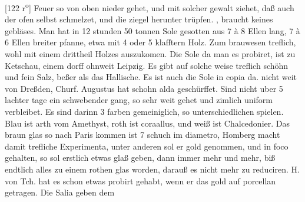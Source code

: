                 \vspace*{8mm}
                \pstart 
                \normalsize
            [122 r\textsuperscript{o}] Feuer\protect{} so von oben nieder gehet, und mit solcher gewalt ziehet, daß auch der ofen\protect{} selbst schmelzet, und die ziegel herunter tr\"{u}pfen. , braucht keines gebl\"{a}ses\protect{}. Man hat in 12 stunden 50 tonnen Sole\protect{} gesotten aus 7 \`{a} 8 Ellen lang, 7 \`{a} 6 Ellen breiter pfanne, etwa mit 4 oder 5 klafftern Holz. Zum brauwesen\protect{} treflich, wohl mit einem drittheil Holzes auszukomen. Die Sole\protect{} da man es probiret, ist zu Ketschau\protect{}, einem dorff ohnweit Leipzig\protect{}. Es gibt auf solche weise treflich sch\"{o}hn und fein Salz\protect{}, beßer als das Hallische. Es ist auch die Sole\protect{} in copia da. \pend \pstart  {} nicht weit von Dreßden\protect{}, Churf. Augustus\protect{} hat schohn alda gesch\"{u}rffet. Sind nicht uber 5 lachter  tage ein schwebender gang, so sehr weit gehet und zimlich uniform verbleibet. Es sind darinn 3 farben gemeiniglich, so unterschiedlichen spielen. Blau ist arth vom Amethyst, roth ist coraallus, und weiß ist Chalcedonier. \pend \pstart  Das braun glas\protect{} so nach Paris\protect{} kommen ist 7 schuch im diametro, Homberg\protect{} macht damit trefliche Experimenta, unter anderen sol er gold\protect{} genommen, und  in foco\protect{} gehalten, so sol erstlich etwas glaß geben, dann immer mehr und mehr, biß endtlich alles zu einem rothen glas\protect{} worden, darauß es nicht mehr zu reduciren.  H. von Tch.  \protect{} hat es schon  etwas probirt gehabt, wenn er das gold\protect{} auf porcellan\protect{} getragen. \pend \pstart   Die Salia\protect{} geben dem 